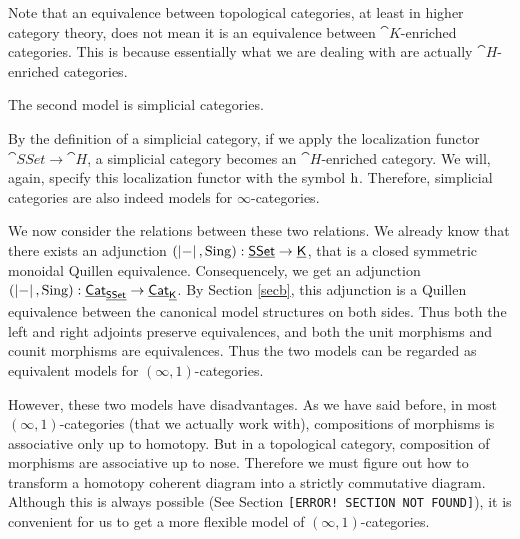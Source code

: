 Note that an equivalence between topological categories, at least in higher category theory, does not mean it is an equivalence
between $\cat K$-enriched categories. This is because essentially what we are dealing with are actually $\cat{H}$-enriched categories.

The second model is simplicial categories.


By the definition of a simplicial category, if we apply the localization functor $\cat{SSet}\to\cat H$, a simplicial category becomes an
$\cat{H}$-enriched category. We will, again, specify this localization functor with the symbol $\mathrm{h}$. Therefore, simplicial categories
are also indeed models for $\infty$-categories. 


We now consider the relations between these two relations. We already know that there exists an adjunction $(\left|-\right|,\operatorname{Sing}):\underline{\smash{\mathsf{SSet}}}\to\underline{\smash{\mathsf{K}}}$,
that is a closed symmetric monoidal Quillen equivalence. Consequencely, we get an adjunction 
$(\left|-\right|,\operatorname{Sing}):\underline{\smash{\mathsf{Cat}}}_{\underline{\smash{\mathsf{SSet}}}}\to\underline{\smash{\mathsf{Cat}}}_{\underline{\smash{\mathsf{K}}}}$. By Section \ref{secb}, this adjunction is a Quillen equivalence between the
canonical model structures on both sides. Thus both the left and right adjoints preserve equivalences, and both the unit morphisms 
and counit morphisms are equivalences. Thus the two models can be regarded as equivalent models for $(\infty,1)$-categories.

However, these two models have disadvantages. As we have said before, in most $(\infty,1)$-categories (that we actually work with), compositions
of morphisms is associative only up to homotopy. But in a topological category, composition of morphisms are associative up to nose. 
Therefore we must figure out how to transform a homotopy coherent diagram into a strictly commutative diagram. Although this is always
possible (See Section {\color{red}\texttt{[ERROR! SECTION NOT FOUND]}}), it is convenient for us to get a more flexible model 
of $(\infty,1)$-categories.

